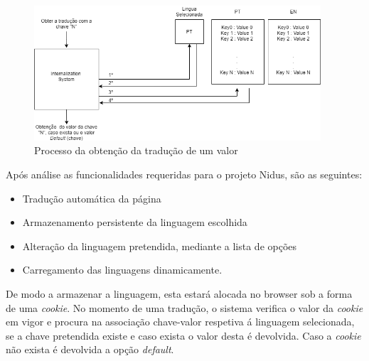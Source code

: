 \begin{figure}[ht]
\centering
\includegraphics[width=0.95\textwidth]{images/i18n.png}
\caption{Processo da obtenção da tradução de um valor}\label{i18n}
\end{figure}

\par Após análise as funcionalidades requeridas para o projeto Nidus, são as seguintes:

\begin{itemize}
\item Tradução automática da página
\item Armazenamento persistente da linguagem escolhida
\item Alteração da linguagem pretendida, mediante a lista de opções
\item Carregamento das linguagens dinamicamente.
\end{itemize} 

\par De modo a armazenar a linguagem, esta estará alocada no browser sob a forma de uma \textit{cookie}. No momento de uma tradução, o sistema verifica o valor da \textit{cookie} em vigor e procura na associação chave-valor respetiva á linguagem selecionada, se a chave pretendida existe e caso exista o valor desta é devolvida. Caso a \textit{cookie} não exista é devolvida a opção \textit{default}.

